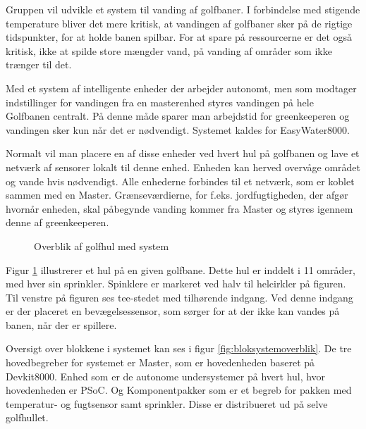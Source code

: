 Gruppen vil udvikle et system til vanding af golfbaner. I forbindelse med stigende temperature bliver det mere kritisk, at vandingen af golfbaner sker på de rigtige tidspunkter, for at holde banen spilbar. For at spare på ressourcerne er det også kritisk, ikke at spilde store mængder vand, på vanding af områder som ikke trænger til det.

Med et system af intelligente enheder der arbejder autonomt, men som modtager indstillinger for vandingen fra en masterenhed styres vandingen på hele Golfbanen centralt. På denne måde sparer man arbejdstid for greenkeeperen og vandingen sker kun når det er nødvendigt.
Systemet kaldes for EasyWater8000.

Normalt vil man placere en af disse enheder ved hvert hul på golfbanen og lave et netværk af sensorer lokalt til denne enhed. Enheden kan herved overvåge området og vande hvis nødvendigt. Alle enhederne forbindes til et netværk, som er koblet sammen med en Master. Grænseværdierne, for f.eks. jordfugtigheden, der afgør hvornår enheden, skal påbegynde vanding kommer fra Master og styres igennem denne af greenkeeperen. 

\begin{figure}[ht] \centering
{}
\caption{Overblik af golfhul med system}
\label{fig:systemoverblik}
\end{figure}

Figur \ref{fig:systemoverblik} illustrerer et hul på en given golfbane. Dette hul er inddelt i 11 områder, med hver sin sprinkler. Spinklere er markeret ved halv til helcirkler på figuren. Til venstre på figuren ses tee-stedet med tilhørende indgang. Ved denne indgang er der placeret en bevægelsessensor, som sørger for at der ikke kan vandes på banen, når der er spillere. 

Oversigt over blokkene i systemet kan ses i figur \ref{fig:bloksystemoverblik}. De tre hovedbegreber for systemet er Master, som er hovedenheden baseret på Devkit8000. Enhed som er de autonome undersystemer på hvert hul, hvor hovedenheden er PSoC. Og Komponentpakker som er et begreb for pakken med temperatur- og fugtsensor samt sprinkler. Disse er distribueret ud på selve golfhullet.


